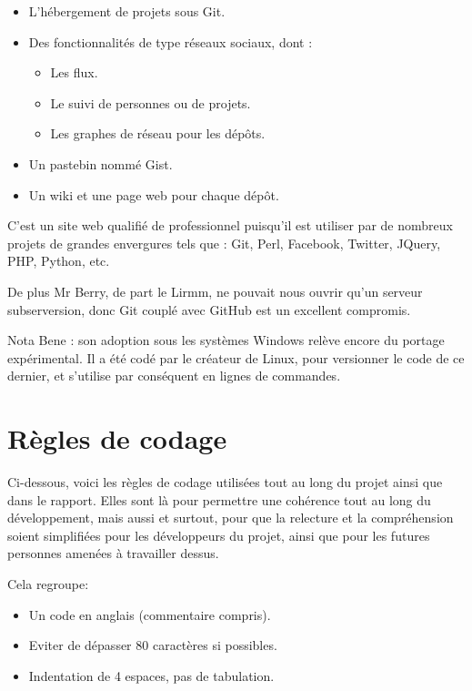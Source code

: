     \begin{itemize}
    \item L'hébergement de projets sous Git.
    \item Des fonctionnalités de type réseaux sociaux, dont :
        \begin{itemize}
        \item Les flux.
        \item Le suivi de personnes ou de projets.
        \item Les graphes de réseau pour les dépôts.
        \end{itemize}
    \item Un pastebin nommé Gist.
    \item Un wiki et une page web pour chaque dépôt.
    \end{itemize}

    C'est un site web qualifié de professionnel puisqu'il est utiliser par de 
    nombreux projets de grandes envergures tels que : Git, Perl, Facebook, Twitter,
    JQuery, PHP, Python, etc.

        De plus Mr Berry, de part le Lirmm, ne pouvait nous ouvrir qu'un serveur
    subserversion, donc Git couplé avec GitHub est un excellent compromis.

    Nota Bene : son adoption sous les systèmes Windows relève encore du portage
    expérimental. Il a été codé par le créateur de Linux, pour versionner le code
    de ce dernier, et s'utilise par conséquent en lignes de commandes.






\newpage
    \section{Règles de codage}
        Ci-dessous, voici les règles de codage utilisées tout au long du projet
    ainsi que dans le rapport. Elles sont là pour permettre une cohérence tout au
    long du développement, mais aussi et surtout, pour que la relecture et la 
    compréhension soient simplifiées pour les développeurs du projet, ainsi que pour les
    futures personnes amenées à travailler dessus.

    Cela regroupe:
    \begin{itemize}
    \item Un code en anglais (commentaire compris).
    \item Eviter de dépasser 80 caractères si possibles.
    \item Indentation de 4 espaces, pas de tabulation.
    \end{itemize}

